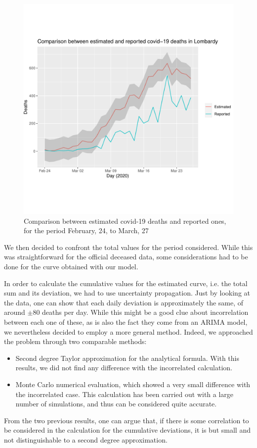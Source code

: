 \documentclass[11pt,a4paper,final]{paper}
\begin{document}
\begin{figure}[h]
\includegraphics[width=\textwidth]{../images/confront.pdf}
\caption{Comparison between estimated covid-19 deaths and reported ones, for the period February, 24, to March, 27}
\label{fig:comp}
\end{figure}

We then decided to confront the total values for the period considered. While this was straightforward for the official deceased data, some considerations had to be done for the curve obtained with our model.

In order to calculate the cumulative values for the estimated curve, i.e. the total sum and its deviation, we had to use uncertainty propagation. Just by looking at the data, one can show that each daily deviation is approximately the same, of around  $\pm 80$ deaths per day.
 While this might be a good clue about incorrelation between each one of these, as is also the fact they come from an ARIMA model, we nevertheless decided to employ a more general method. Indeed, we approached the problem through two comparable methods:
 \begin{itemize}
 	\item Second degree Taylor approximation for the analytical formula. With this results, we did not find any difference with the incorrelated calculation.
 	\item Monte Carlo numerical evaluation, which showed a very small difference with the incorrelated case. This calculation has been carried out with a large number of simulations, and thus can be considered quite accurate.\cite{uncertainty}
 \end{itemize}
From the two previous results, one can argue that, if there is some correlation to be considered in the calculation for the cumulative deviations, it is but small and not distinguishable to a second degree approximation.
\end{document}
